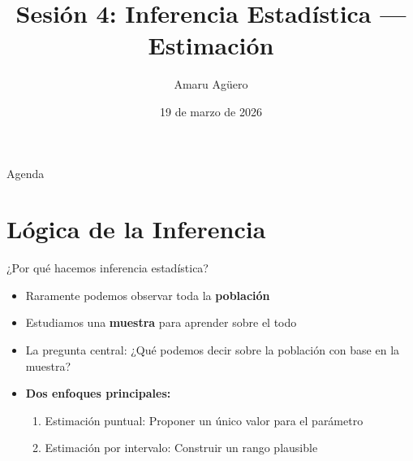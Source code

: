 \documentclass[aspectratio=169,11pt]{beamer}
\institute[CICS — UDD]{Doctorado en Ciencias de la Complejidad Social — CICS, UDD}
\date{19 de marzo de 2026}
\title{Sesión 4: Inferencia Estadística — Estimación}
\author[A. Agüero]{Amaru Agüero}
\begin{document}
\begin{frame}[plain]
\titlepage
\end{frame}

\begin{frame}{Agenda}
\tableofcontents
\end{frame}

\section{Lógica de la Inferencia}

\begin{frame}{¿Por qué hacemos inferencia estadística?}
\begin{itemize}
  \item Raramente podemos observar toda la \textbf{población}
  \pause
  \item Estudiamos una \textbf{muestra} para aprender sobre el todo
  \pause
  \item La pregunta central: ¿Qué podemos decir sobre la población con base en la muestra?
  \pause
  \item \textbf{Dos enfoques principales:}
  \begin{enumerate}
    \item Estimación puntual: Proponer un único valor para el parámetro
    \item Estimación por intervalo: Construir un rango plausible
  \end{enumerate}
\end{itemize}
\end{frame}
\end{document}
